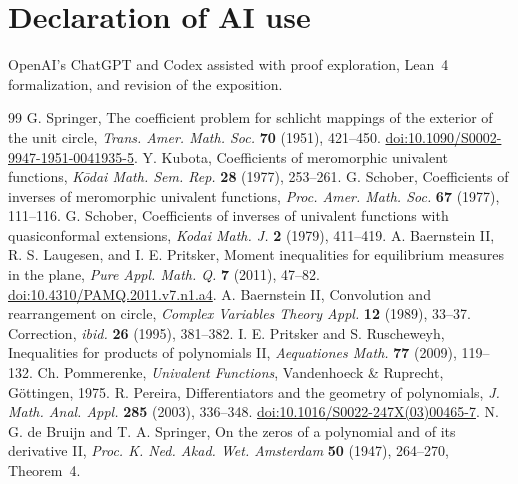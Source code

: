 \documentclass[11pt]{article}
\begin{document}
	\section*{Declaration of AI use}
	OpenAI's ChatGPT and Codex assisted with proof exploration, Lean~4
	formalization, and revision of the exposition.
	
	\begingroup\small
	\begin{thebibliography}{99}
		 G. Springer,
		The coefficient problem for schlicht mappings of the exterior of the unit circle,
		\emph{Trans. Amer. Math. Soc.} \textbf{70} (1951), 421--450.
		\href{https://doi.org/10.1090/S0002-9947-1951-0041935-5}{doi:10.1090/S0002-9947-1951-0041935-5}.
		 Y. Kubota, Coefficients of meromorphic univalent functions,
		\emph{K\=odai Math. Sem. Rep.} \textbf{28} (1977), 253--261.
		 G. Schober, Coefficients of inverses of meromorphic
		univalent functions, \emph{Proc. Amer. Math. Soc.} \textbf{67} (1977), 111--116.
		 G. Schober,
		Coefficients of inverses of univalent functions with quasiconformal extensions,
		\emph{Kodai Math. J.} \textbf{2} (1979), 411--419.
		 A. Baernstein II, R. S. Laugesen, and I. E. Pritsker,
		Moment inequalities for equilibrium measures in the plane,
		\emph{Pure Appl. Math. Q.} \textbf{7} (2011), 47--82.
		\href{https://doi.org/10.4310/PAMQ.2011.v7.n1.a4}{doi:10.4310/PAMQ.2011.v7.n1.a4}.
		 A. Baernstein II, Convolution and rearrangement on circle,
		\emph{Complex Variables Theory Appl.} \textbf{12} (1989), 33--37.
		Correction, \emph{ibid.} \textbf{26} (1995), 381--382.
		 I. E. Pritsker and S. Ruscheweyh,
		Inequalities for products of polynomials II,
		\emph{Aequationes Math.} \textbf{77} (2009), 119--132.
		 Ch. Pommerenke, \emph{Univalent Functions},
		Vandenhoeck \& Ruprecht, G\"ottingen, 1975.
		 R. Pereira, Differentiators and the geometry of
		polynomials, \emph{J. Math. Anal. Appl.} \textbf{285} (2003), 336--348.
		\href{https://doi.org/10.1016/S0022-247X(03)00465-7}{doi:10.1016/S0022-247X(03)00465-7}.
		 N. G. de Bruijn and T. A. Springer,
		On the zeros of a polynomial and of its derivative II,
		\emph{Proc. K. Ned. Akad. Wet. Amsterdam} \textbf{50} (1947), 264--270,
		Theorem~4.
	\end{thebibliography}
	\endgroup
	
\end{document}
